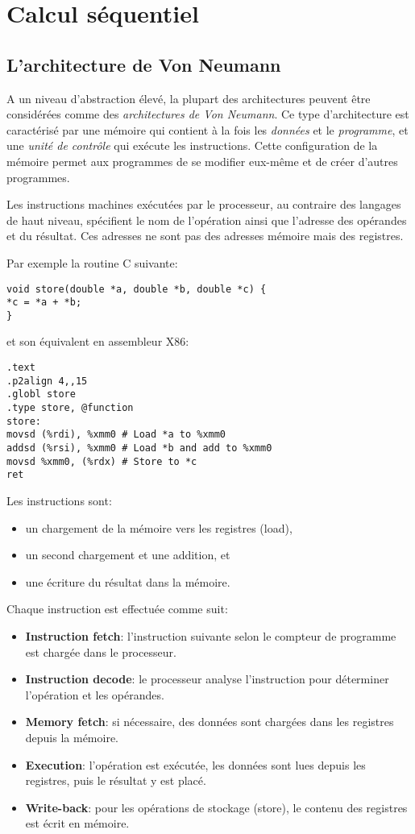 \chapter{Calcul séquentiel}

\section{L'architecture de Von Neumann}

A un niveau d'abstraction élevé, la plupart des architectures peuvent être considérées comme des \textit{architectures de Von Neumann}. Ce type d'architecture est caractérisé par une mémoire qui contient à la fois les \textit{données} et le \textit{programme}, et une \textit{unité de contrôle} qui exécute les instructions.
Cette configuration de la mémoire permet aux programmes de se modifier eux-même et de créer d'autres programmes.

Les instructions machines exécutées par le processeur, au contraire des langages de haut niveau, spécifient le nom de l'opération
ainsi que l'adresse des opérandes et du résultat. Ces adresses ne sont pas des adresses mémoire mais des registres.

Par exemple la routine C suivante:
\begin{verbatim}
void store(double *a, double *b, double *c) {
*c = *a + *b;
}
\end{verbatim}
et son équivalent en assembleur X86:
\begin{verbatim}
.text
.p2align 4,,15
.globl store
.type store, @function
store:
movsd (%rdi), %xmm0 # Load *a to %xmm0
addsd (%rsi), %xmm0 # Load *b and add to %xmm0
movsd %xmm0, (%rdx) # Store to *c
ret
\end{verbatim}

Les instructions sont:
\begin{itemize}
	\item un chargement de la mémoire vers les registres (load),
	\item un second chargement et une addition, et
	\item une écriture du résultat dans la mémoire.
\end{itemize}
	
Chaque instruction est effectuée comme suit:

\begin{itemize}
	\item \textbf{Instruction fetch}: l'instruction suivante selon le compteur de programme est chargée dans le processeur.
	\item \textbf{Instruction decode}: le processeur analyse l'instruction pour déterminer l'opération et les opérandes.
	\item \textbf{Memory fetch}: si nécessaire, des données sont chargées dans les registres depuis la mémoire.
	\item \textbf{Execution}: l'opération est exécutée, les données sont lues depuis les registres, puis le résultat y est placé. 
	\item \textbf{Write-back}: pour les opérations de stockage (store), le contenu des registres est écrit en mémoire.
\end{itemize}

